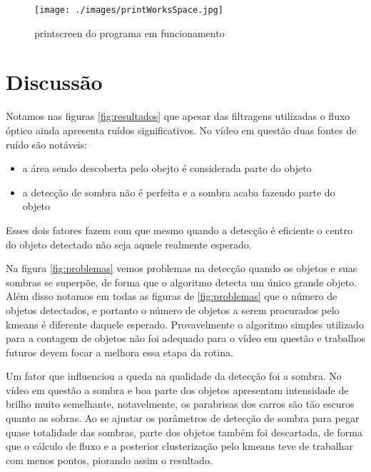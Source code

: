 \documentclass[journal]{IEEEtran}
\begin{document}
\FloatBarrier
\begin{figure}[h]
  \centering
  \texttt{[image: ./images/printWorksSpace.jpg]} \\
  \caption{printscreen do programa em funcionamento}
  \label{fig:printScreen}
\end{figure}
\FloatBarrier


\newpage
\section{Discussão}
Notamos nas figuras \ref{fig:resultados} que apesar das filtragens utilizadas o
fluxo óptico ainda apresenta ruídos significativos. No vídeo em questão
duas fontes de ruído são notáveis:
\begin{itemize}
  \item a área sendo descoberta pelo obejto é considerada parte do objeto
  \item a detecção de sombra não é perfeita e a sombra acaba fazendo parte
  do objeto
\end{itemize}
Esses dois fatores fazem com que mesmo quando a detecção é eficiente
o centro do objeto detectado não seja aquele
realmente esperado.

Na figura \ref{fig:problemas} vemos problemas na detecção quando os objetos e 
suas sombras se superpõe, de forma que o algoritmo detecta um único grande 
objeto. Além disso notamos em todas as figuras de \ref{fig:problemas} que o 
número de objetos detectados, e portanto o número de objetos a serem procurados
pelo kmeans é diferente daquele esperado. Provavelmente o algoritmo simples
utilizado para a contagem de objetos não foi adequado para o vídeo em questão e
trabalhos futuros devem focar a melhora essa etapa da rotina.
 
 Um fator que influenciou a queda na qualidade da detecção foi a sombra. No vídeo
 em questão a sombra e boa parte dos objetos apresentam intensidade de brilho 
 muito semelhante, notavelmente, os parabrisas dos carros são tão escuros quanto
 as sobras. Ao se ajustar os parâmetros de detecção de 
 sombra para pegar quase totalidade das sombras, parte dos objetos também
 foi descartada, de forma que o cálculo de fluxo e a posterior
 clusterização pelo kmeans teve de trabalhar com menos pontos, piorando assim o 
 resultado.
\end{document}
